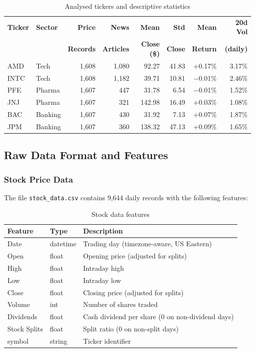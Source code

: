 \documentclass[12pt, a4paper]{article}
\begin{document}
\begin{table}[htbp]
\centering
\caption{Analysed tickers and descriptive statistics}
\label{tab:tickers}
\begin{tabular}{llrrrrrr}
\toprule
\textbf{Ticker} & \textbf{Sector} & \textbf{Price} & \textbf{News} & \textbf{Mean} & \textbf{Std} & \textbf{Mean} & \textbf{20d Vol} \\
 & & \textbf{Records} & \textbf{Articles} & \textbf{Close (\$)} & \textbf{Close} & \textbf{Return} & \textbf{(daily)} \\
\midrule
AMD  & Tech    & 1{,}608 & 1{,}080 & 92.27  & 41.83 & +0.17\%  & 3.17\% \\
INTC & Tech    & 1{,}608 & 1{,}182 & 39.71  & 10.81 & $-$0.01\% & 2.46\% \\
PFE  & Pharma  & 1{,}607 &   447   & 31.78  &  6.54 & $-$0.01\% & 1.52\% \\
JNJ  & Pharma  & 1{,}607 &   321   & 142.98 & 16.49 & +0.03\%  & 1.08\% \\
BAC  & Banking & 1{,}607 &   430   & 31.92  &  7.13 & +0.07\%  & 1.87\% \\
JPM  & Banking & 1{,}607 &   360   & 138.32 & 47.13 & +0.09\%  & 1.65\% \\
\bottomrule
\end{tabular}
\end{table}

\subsection{Raw Data Format and Features}

\subsubsection{Stock Price Data}

The file \texttt{stock\_data.csv} contains 9{,}644 daily records with the following features:

\begin{table}[htbp]
\centering
\caption{Stock data features}
\label{tab:stock_features}
\begin{tabular}{llp{8cm}}
\toprule
\textbf{Feature} & \textbf{Type} & \textbf{Description} \\
\midrule
Date          & datetime & Trading day (timezone-aware, US Eastern) \\
Open          & float    & Opening price (adjusted for splits) \\
High          & float    & Intraday high \\
Low           & float    & Intraday low \\
Close         & float    & Closing price (adjusted for splits) \\
Volume        & int      & Number of shares traded \\
Dividends     & float    & Cash dividend per share (0 on non-dividend days) \\
Stock Splits  & float    & Split ratio (0 on non-split days) \\
symbol        & string   & Ticker identifier \\
\bottomrule
\end{tabular}
\end{table}
\end{document}
